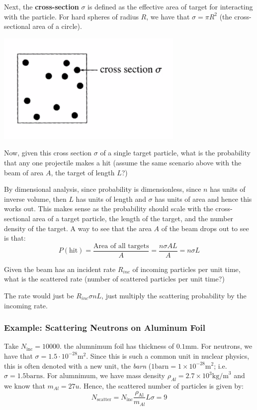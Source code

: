 \documentclass[../PHYS306Notes.tex]{subfiles}
\begin{document}
Next, the \textbf{cross-section} $\sigma$ is defined as the effective area of target for interacting with the particle. For hard spheres of radius $R$, we have that $\sigma = \pi R^2$ (the cross-sectional area of a circle). 
\begin{center}
    \includegraphics[scale=0.8]{Lecture-27/l27-img5.png}
\end{center}
Now, given this cross section $\sigma$ of a single target particle, what is the probability that any one projectile makes a hit (assume the same scenario above with the beam of area $A$, the target of length $L$?)
\begin{s}
By dimensional analysis, since probability is dimensionless, since $n$ has units of inverse volume, then $L$ has units of length and $\sigma$ has units of area and hence this works out. This makes sense as the probability should scale with the cross-sectional area of a target particle, the length of the target, and the number density of the target. A way to see that the area $A$ of the beam drops out to see is that:
\[P(\text{hit}) = \frac{\text{Area of all targets}}{A} = \frac{n\sigma A L}{A} = n\sigma L\]
\end{s}
Given the beam has an incident rate $R_{inc}$ of incoming particles per unit time, what is the scattered rate (number of scattered particles per unit time?)
\begin{s}
The rate would just be $R_{inc}\sigma n L$, just multiply the scattering probability by the incoming rate.
\end{s}

\subsubsection{Example: Scattering Neutrons on Aluminum Foil}
Take $N_{\text{inc}} = 10000$. the alumnimum foil has thickness of $0.1\text{mm}$. For neutrons, we have that $\sigma = 1.5 \cdot 10^{-28}\text{m}^2$. Since this is such a common unit in nuclear physics, this is often denoted with a new unit, the \textit{barn} ($1 \text{barn} = 1\times 10^{-28}\text{m}^2$; i.e. $\sigma = 1.5\text{barns}$. For alumnimum, we have mass density $\rho_{Al} = 2.7\times 10^3 \text{kg/m}^3$ and we know that $m_{Al} = 27u$. Hence, the scattered number of particles is given by:
\[N_{\text{scatter}} = N_{\text{inc}}\frac{\rho_{\text{Al}}}{m_{Al}}L\sigma = 9\]
\end{document}
